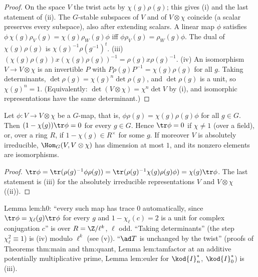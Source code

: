 \begin{proof}
On the space $V$ the twist acts by $\chi(g)\rho(g)$; this gives (i) and the last statement of (ii). The $G$-stable subspaces of $V$ and of
$V\otimes\chi$ coincide (a scalar preserves every subspace), also after extending scalars. A linear map $\phi$ satisfies
$\phi\,\chi(g)\rho_V(g)=\chi(g)\rho_W(g)\phi$ iff $\phi\rho_V(g)=\rho_W(g)\phi$. The dual of $\chi(g)\rho(g)$ is $\chi(g)^{-1}\rho(g^{-1})^t$. (iii)
$(\chi(g)\rho(g))x(\chi(g)\rho(g))^{-1}=\rho(g)x\rho(g)^{-1}$. (iv) An isomorphism $V\to V\otimes\chi$ is an invertible $P$ with $P\rho(g)P^{-1}=\chi(g)\rho(g)$ for all $g$. Taking
determinants, $\det\rho(g)=\chi(g)^n\det\rho(g)$, and $\det\rho(g)$ is a unit, so $\chi(g)^n=1$. (Equivalently: $\det(V\otimes\chi)=\chi^n\det V$ by (i), and
isomorphic representations have the same determinant.)
\end{proof}

\begin{lemma}\label{lem:reps:trace-zero}
Let $\phi\colon V\to V\otimes\chi$ be a $G$-map, that is, $\phi\rho(g)=\chi(g)\rho(g)\phi$ for all $g\in G$. Then $(1-\chi(g))\tr\phi=0$ for every $g\in G$. Hence
$\tr\phi=0$ if $\chi\ne1$ (over a field), or, over a ring $R$, if $1-\chi(g)\in R^\times$ for some $g$. If moreover $V$ is absolutely irreducible,
$\Hom_G(V,V\otimes\chi)$ has dimension at most $1$, and its nonzero elements are isomorphisms.
\end{lemma}

\begin{proof}
$\tr\phi=\tr(\rho(g)^{-1}\phi\rho(g))=\tr(\rho(g)^{-1}\chi(g)\rho(g)\phi)=\chi(g)\tr\phi$. The last statement is (iii) for the absolutely
irreducible representations $V$ and $V\otimes\chi$ ((ii)).
\end{proof}

\begin{paperlink}
Lemma lem:h0: ``every such map has trace $0$ automatically, since $\tr\phi=\chi_\ell(g)\tr\phi$ for every $g$ and $1-\chi_\ell(c)=2$ is a unit for
complex conjugation $c$'' is  over $R=\Z/\ell^k$, $\ell$ odd. ``Taking determinants'' (the step $\chi_\ell^2\equiv1$) is
(iv) modulo $\ell^k$ (see (v)). ``$\ad T$ is unchanged by the twist'' (proofs of Theorems thm:main
and thm:quant, Lemma lem:tamfactor at an additive potentially multiplicative prime, Lemma lem:euler for $\kod{I}_n^*$, $\kod{I}_0^*$) is (iii).
\end{paperlink}


